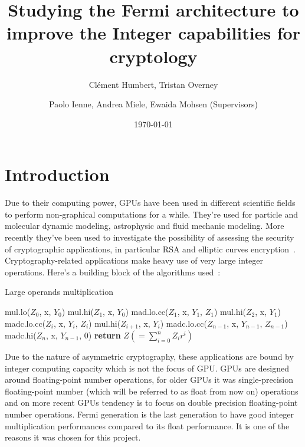 \documentclass{report}
\begin{document}
\title{Studying the Fermi architecture to improve the Integer capabilities for cryptology}
\author{Cl\'{e}ment Humbert, Tristan Overney\and Paolo Ienne, Andrea Miele, Ewaida Mohsen (Supervisors)}
\date{\today}
\maketitle

\nocite{*}

\setcounter{tocdepth}{1}
\tableofcontents
\listoffigures

\chapter{Introduction}

    Due to their computing power, GPUs have been used in different scientific fields to perform
    non-graphical computations for a while. They're used for particle and molecular dynamic 
    modeling, astrophysic and fluid mechanic modeling.
    More recently they've been used to investigate the possibility of assessing the security of
    cryptographic applications, in particular RSA and elliptic curves encryption~\cite{cofact14}.
    Cryptography-related applications make heavy use of very large integer operations.
    Here's a building block of the algorithms used~\cite{cofact14}:
    \begin{algorithm}
    \caption{Large operands multiplication}\label{alg:mulalgo}
    \begin{algorithmic}[1]
        \State mul.lo($Z_0$, x, $Y_0$)
        \State mul.hi($Z_1$, x, $Y_0$)
        \State mad.lo.cc($Z_1$, x, $Y_1$, $Z_1$)
        \State mul.hi($Z_2$, x, $Y_1$)
            \State madc.lo.cc($Z_i$, x, $Y_i$, $Z_i$)
            \State mul.hi($Z_{i+1}$, x, $Y_i$)
        \EndFor
        \State madc.lo.cc($Z_{n-1}$, x, $Y_{n-1}$, $Z_{n-1}$)
        \State madc.hi($Z_n$, x, $Y_{n-1}$, 0)
        \State \textbf{return} $Z (=\sum_{i=0}^nZ_ir^i)$
    \end{algorithmic}
    \end{algorithm}

    Due to the nature of asymmetric cryptography, these applications are bound by
    integer computing capacity which is not the focus of GPU. GPUs are designed
    around floating-point number operations, for older GPUs it was single-precision
    floating-point number (which will be referred to as float from now on) operations and
    on more recent GPUs tendency is to focus on double precision floating-point number operations.
    Fermi generation is the last generation to have good integer multiplication performances
    compared to its float performance. It is one of the reasons it was chosen for this project.
\end{document}
